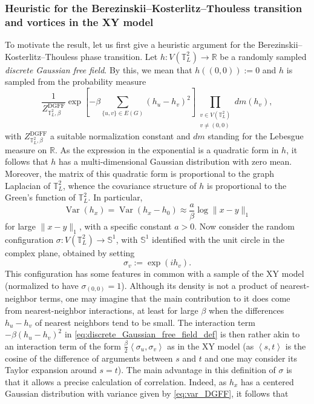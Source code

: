 \documentclass[12pt,reqno]{article}
\def\R{\mathbb{R}}
\def\T{\mathbb{T}}
\DeclareMathOperator{\var}{Var}
\begin{document}
\subsubsection{Heuristic for the Berezinskii--Kosterlitz--Thouless transition and vortices in the XY model}
\label{sec:heuristic_for_Berezinskii-Kosterlitz-Thouless}
To motivate the result, let us first give a heuristic
argument for the Berezinskii--Kosterlitz--Thouless phase transition.
Let $h:V(\T_L^2)\to\R$ be a randomly sampled \emph{discrete Gaussian
free field}. By this, we mean that $h((0,0)) := 0$ and $h$ is
sampled from the probability measure
\begin{equation}\label{eq:discrete_Gaussian_free_field_def}
  \frac{1}{Z^{\text{DGFF}}_{\T_L^2,\beta}} \exp \left[-\beta \sum_{\{u,v\}\in
E(G)} (h_u - h_v)^2\right] \prod_{\substack{v\in V(\T_L^2)\\v\neq (0,0)}} dm(h_v),
\end{equation}
with $Z^{\text{DGFF}}_{\T_L^2,\beta}$ a suitable normalization constant and $dm$ standing for the Lebesgue measure on $\R$. As the expression in the exponential is a quadratic form in $h$, it follows that $h$ has a multi-dimensional Gaussian distribution with zero mean. Moreover, the matrix of this quadratic form is proportional to the graph Laplacian of $\T_L^2$, whence the covariance structure of $h$ is proportional to the Green's function of $\T_L^2$. In particular,
\begin{equation}\label{eq:var_DGFF}
  \var(h_x) = \var(h_x - h_0)\approx \frac{a}{\beta}\log\|x-y\|_1
\end{equation}
for large $\|x-y\|_1$, with a specific constant $a>0$. Now consider the random configuration $\sigma:V(\T_L^2)\to \mathbb S^1$, with $\mathbb S^1$ identified with the unit circle in the complex plane, obtained by setting
\begin{equation}\label{eq:sigma_exponential_def}
  \sigma_v := \exp(i h_v).
\end{equation}
This configuration has some features in common with a sample of the XY model (normalized to have $\sigma_{(0,0)} = 1$). Although its density is not a product of nearest-neighbor terms, one may imagine that the main contribution to it does come from nearest-neighbor interactions, at least for large $\beta$ when the differences $h_u - h_v$ of nearest neighbors tend to be small. The interaction term $-\beta(h_u-h_v)^2$ in \eqref{eq:discrete_Gaussian_free_field_def} is then rather akin to an interaction term of the form $\frac{\beta}{2}\left\langle\sigma_u,\sigma_v\right\rangle$ as in the XY model (as $\left\langle s,t\right\rangle$ is the cosine of the difference of arguments between $s$ and $t$ and one may consider its Taylor expansion around $s=t$). The main advantage in this definition of $\sigma$ is that it allows a precise calculation of correlation. Indeed, as $h_x$ has a centered Gaussian distribution with variance given by \eqref{eq:var_DGFF}, it follows that
\end{document}
